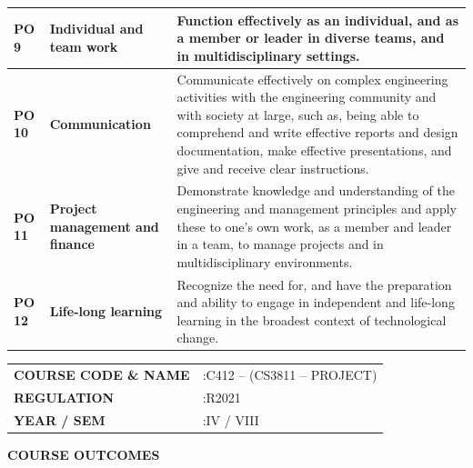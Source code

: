 \documentclass[12pt,a4paper]{report}
\begin{document}
{\begin{tabular}{|p{}|p{}|p{}|}
\hline
\textbf{PO 9}  & \textbf{Individual and team work}       & Function effectively as an individual, and as a member or leader in diverse teams, and in multidisciplinary settings. \\
\hline
\textbf{PO 10} & \textbf{Communication}                  & Communicate effectively on complex engineering activities with the engineering community and with society at large, such as, being able to comprehend and write effective reports and design documentation, make effective presentations, and give and receive clear instructions. \\
\hline
\textbf{PO 11} & \textbf{Project management and finance} & Demonstrate knowledge and understanding of the engineering and management principles and apply these to one's own work, as a member and leader in a team, to manage projects and in multidisciplinary environments. \\
\hline
\textbf{PO 12} & \textbf{Life-long learning}             & Recognize the need for, and have the preparation and ability to engage in independent and life-long learning in the broadest context of technological change. \\
\hline
\end{tabular}
}

\clearpage
{}
\vspace*{\fill}

\begin{flushleft}
{\fontsize{11}{14}\selectfont
\begin{tabular}{@{}ll@{}}
\textbf{COURSE CODE \& NAME} & :\quad C412 -- (CS3811 -- PROJECT) \\[2pt]
\textbf{REGULATION}          & :\quad R2021 \\[2pt]
\textbf{YEAR / SEM}          & :\quad IV / VIII \\
\end{tabular}
}
\end{flushleft}
\vspace{14pt}

\begin{center}
  {\large\bfseries COURSE OUTCOMES}
\end{center}
\vspace{6pt}
\end{document}
